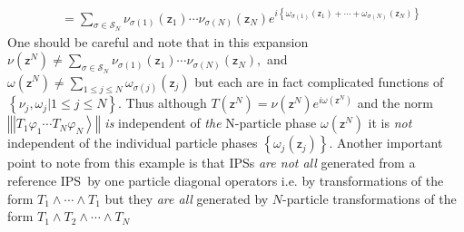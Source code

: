 \documentclass[aps,preprint]{revtex4}%
\begin{document}
\begin{enumerate}
\begin{align}
&  =\sum_{\sigma\in\mathcal{S}_{N}}\nu_{\sigma\left(  1\right)  }\left(
\mathsf{z}_{1}\right)  \cdots\nu_{\sigma\left(  N\right)  }\left(
\mathsf{z}_{N}\right)  e^{i\left\{  \omega_{\sigma\left(  1\right)  }\left(
\mathsf{z}_{1}\right)  +\cdots+\omega_{\sigma\left(  N\right)  }\left(
\mathsf{z}_{N}\right)  \right\}  }%
\end{align}
One should be careful and note that in this expansion $\nu\left(
\mathsf{z}^{N}\right)  \neq\sum_{\sigma\in\mathcal{S}_{N}}\nu_{\sigma\left(
1\right)  }\left(  \mathsf{z}_{1}\right)  \cdots\nu_{\sigma\left(  N\right)
}\left(  \mathsf{z}_{N}\right)  ,$ and $\omega\left(  \mathsf{z}^{N}\right)
\neq\sum\limits_{1\leq j\leq N}\omega_{\sigma\left(  j\right)  }\left(
\mathsf{z}_{j}\right)  $ but each are in fact complicated functions of
$\left\{  \nu_{j},\omega_{j}|1\leq j\leq N\right\}  $. Thus although $T\left(
\mathsf{z}^{N}\right)  =\nu\left(  \mathsf{z}^{N}\right)  e^{i\omega\left(
\mathsf{z}^{N}\right)  }$ and the norm $\left\Vert \left\vert T_{1}\varphi
_{1}\cdots T_{N}\varphi_{N}\right\rangle \right\Vert $ \emph{is} independent
of\emph{ the }N-particle phase $\omega\left(  \mathsf{z}^{N}\right)  $ it is
\emph{not }independent of the individual particle phases $\left\{  \omega
_{j}\left(  \mathsf{z}_{j}\right)  \right\}  $. Another important point to
note from this example is that IPSs \emph{are not all} generated from a
reference IPS\ by one particle diagonal operators i.e. by transformations of
the form $T_{1}\wedge\cdots\wedge T_{1}$ but they \emph{are all }generated by
$N$-particle transformations of the form $T_{1}\wedge T_{2}\wedge\cdots\wedge
T_{N}$
\end{enumerate}
\end{document}
